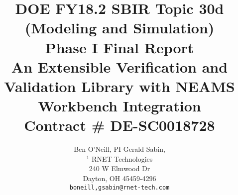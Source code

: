 \title{DOE FY18.2 SBIR Topic 30d (Modeling and Simulation)\\
\vspace{0.25in}Phase I Final Report\\
\vspace{0.1in}An Extensible Verification and Validation Library with NEAMS Workbench Integration\\
\vspace{0.1in}Contract \# DE-SC0018728
\vspace{0.5in}}
\author{Ben O'Neill, PI \hspace{0.75in} Gerald Sabin, 
  \\$^1$ RNET Technologies\\
  240 W Elmwood Dr\\
  Dayton, OH 45459-4296\\
  {\tt {boneill,gsabin}@rnet-tech.com}\\\\
}

